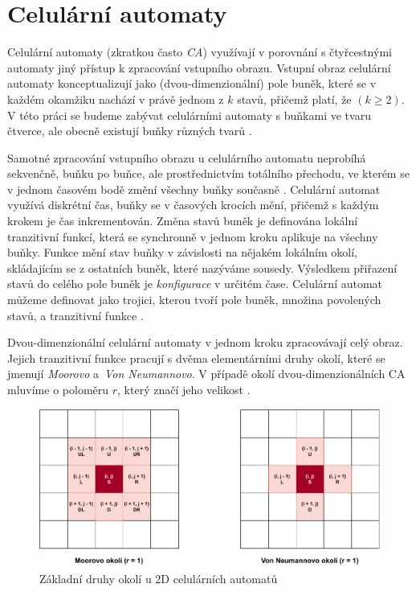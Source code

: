 \section{Celulární automaty}

Celulární automaty (zkratkou často \emph{CA}) využívají v porovnání s čtyřcestnými automaty jiný přístup k zpracování vstupního obrazu. Vstupní obraz celulární automaty konceptualizují jako (dvou-dimenzionální) pole buněk, které se v každém okamžiku nachází v právě jednom z $k$ stavů, přičemž platí, že $(k \geq 2)$. V této práci se budeme zabývat celulárními automaty s buňkami ve tvaru čtverce, ale obecně existují buňky různých tvarů \cite{CATheory}. 

Samotné zpracování vstupního obrazu u celulárního automatu neprobíhá sekvenčně, buňku po buňce, ale prostřednictvím totálního přechodu, ve kterém se v jednom časovém bodě změní všechny buňky současně \cite{RozenbergGrzegorz1997HoFL}. Celulární automat využívá diskrétní čas, buňky se v časových krocích mění, přičemž s každým krokem je čas inkrementován. Změna stavů buněk je definována lokální tranzitivní funkcí, která se synchronně v jednom kroku aplikuje na všechny buňky. Funkce mění stav buňky v závislosti na nějakém lokálním okolí, skládajícím se z ostatních buněk, které nazýváme sousedy. Výsledkem přiřazení stavů do celého pole buněk je \emph{konfigurace} v určitém čase. Celulární automat můžeme definovat jako trojici, kterou tvoří pole buněk, množina povolených stavů, a tranzitivní funkce \cite{CATheory}.

Dvou-dimenzionální celulární automaty v jednom kroku zpracovávají celý obraz. Jejich tranzitivní funkce pracují s dvěma elementárními druhy okolí, které se jmenují \emph{Moorovo} a~\emph{Von Neumannovo}. V případě okolí dvou-dimenzionálních CA mluvíme o poloměru $r$, který značí jeho velikost \cite{CATheory}. 

\begin{figure}[H]
    \centering
    \includegraphics[width=\textwidth]{obrazky-figures/CAOkoli.pdf}
    \caption{Základní druhy okolí u 2D celulárních automatů}
    \label{fig:CAOkoli}
\end{figure}

